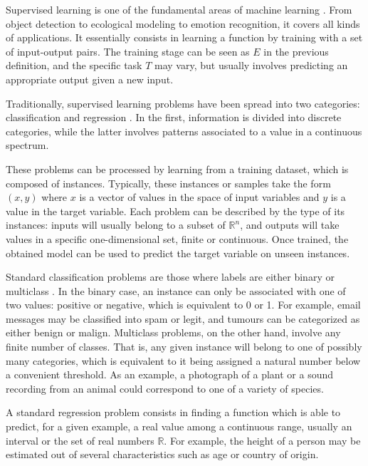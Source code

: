 \documentclass[
	fontsize=11pt, %
	twoside=false, %
	open=any, %
	secnumdepth=1, %
]{kaobook}
\begin{document}
Supervised learning is one of the fundamental areas of machine learning \cite{learning-marsland}. From object detection to ecological modeling to emotion recognition, it covers all kinds of applications. It essentially consists in learning a function by training with a set of input-output pairs. The training stage can be seen as $E$ in the previous definition, and the specific task $T$ may vary, but usually involves predicting an appropriate output given a new input.

Traditionally, supervised learning problems have been spread into two categories: classification and regression \cite{classification,pattern-rec}. In the first, information is divided into discrete categories, while the latter involves patterns associated to a value in a continuous spectrum.

These problems can be processed by learning from a training dataset, which is composed of instances. Typically, these instances or samples take the form $(x, y)$ where $x$ is a vector of values in the space of input variables and $y$ is a value in the target variable. Each problem can be described by the type of its instances: inputs will usually belong to a subset of $\mathbb R^n$, and outputs will take values in a specific one-dimensional set, finite or continuous. Once trained, the obtained model can be used to predict the target variable on unseen instances.

Standard classification problems are those where labels are either binary or multiclass \cite{classification-duda,multiclass}. In the binary case, an instance can only be associated with one of two values: positive or negative, which is equivalent to 0 or 1. For example, email messages may be classified into spam or legit, and tumours can be categorized as either benign or malign. Multiclass problems, on the other hand, involve any finite number of classes. That is, any given instance will belong to one of possibly many categories, which is equivalent to it being assigned a natural number below a convenient threshold. As an example, a photograph of a plant or a sound recording from an animal could correspond to one of a variety of species. 

A standard regression problem \cite{learning-tibshirani,regression} consists in finding a function which is able to predict, for a given example, a real value among a continuous range, usually an interval or the set of real numbers $\mathbb R$. For example, the height of a person may be estimated out of several characteristics such as age or country of origin.
\end{document}
